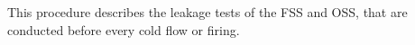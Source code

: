 This procedure describes the leakage tests of the FSS and OSS, that are conducted before every cold flow or firing. 